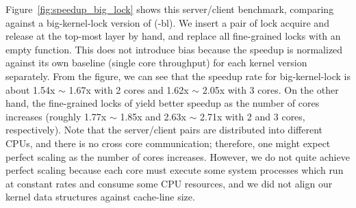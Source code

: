 Figure~\ref{fig:speedup_big_lock} shows this server/client benchmark,
comparing {\cCTOS} against a big-kernel-lock version of {\cCTOS}
({\cCTOS-bl}). We insert a pair of lock acquire and release at the
top-most layer by hand, and replace all fine-grained locks with an
empty function. This does not introduce bias because the speedup is
normalized against its own baseline (single core throughput) for each
kernel version separately. From the figure, we can see that the
speedup rate for big-kernel-lock is about 1.54x $\sim$ 1.67x with 2
cores and 1.62x $\sim$ 2.05x with 3 cores. On the other hand, the
fine-grained locks of {\cCTOS} yield better speedup as the number of
cores increases (roughly 1.77x $\sim$ 1.85x and 2.63x $\sim$ 2.71x
with 2 and 3 cores, respectively). Note that the server/client pairs
are distributed into different CPUs, and there is no cross core
communication; therefore, one might expect perfect scaling as the
number of cores increases.  However, we do not quite achieve perfect
scaling because each core must execute some system processes which run
at constant rates and consume some CPU resources, and we did not align
our kernel data structures against cache-line size.



